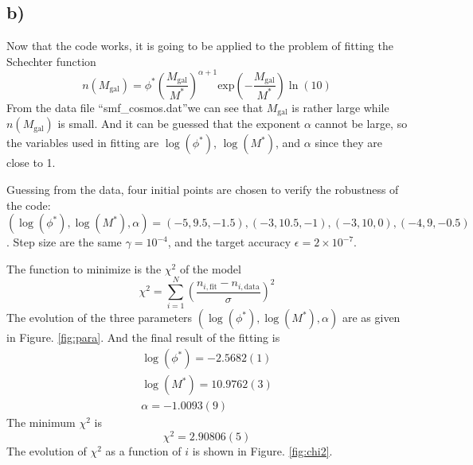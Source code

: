 \documentclass[12pt, graphicx]{article}
\begin{document}
\subsection*{b)}
Now that the code works, it is going to be applied to the problem of fitting the Schechter function
\begin{equation}
n(M_\mathrm{gal})=\phi^*\left(\frac{M_\mathrm{gal}}{M^*}\right)^{\alpha+1}\mathrm{exp}\left(-\frac{M_\mathrm{gal}}{M^*}\right)\ln(10)
\end{equation}
From the data file \textquotedblleft smf\_cosmos.dat\textquotedblright we can see that $M_\mathrm{gal}$ is rather large while $n(M_\mathrm{gal})$ is small. And it can be guessed that the exponent $\alpha$ cannot be large, so the variables used in fitting are $\log(\phi^*)$, $\log(M^*)$, and $\alpha$ since they are close to 1. \par
Guessing from the data, four initial points are chosen to verify the robustness of the code: $(\log(\phi^*),\log(M^*),\alpha)=(-5,9.5,-1.5),(-3,10.5,-1),(-3,10,0),(-4,9,-0.5)$. Step size are the same $\gamma=10^{-4}$, and the target accuracy $\epsilon=2\times10^{-7}$. \par
The function to minimize is the $\chi^2$ of the model
\begin{equation}
\chi^2=\displaystyle\sum_{i=1}^N\left(\frac{n_{i,\mathrm{fit}}-n_{i,\mathrm{data}}}{\sigma}\right)^2
\end{equation}
The evolution of the three parameters $(\log(\phi^*),\log(M^*),\alpha)$ are as given in Figure. \ref{fig:para}. And the final result of the fitting is 
\begin{equation}
\begin{gathered}
\log(\phi^*)=-2.5682(1)\\
\log(M^*)=10.9762(3)\\
\alpha=-1.0093(9)
\end{gathered}
\end{equation}
The minimum $\chi^2$ is 
\begin{equation}
\chi^2=2.90806(5)
\end{equation}
The evolution of $\chi^2$ as  a function of $i$ is shown in Figure. \ref{fig:chi2}.
\end{document}
